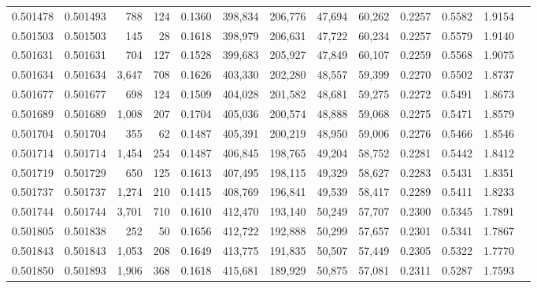 \begin{tabular}{rrrrrrrrrrrrr}
0.501478 & 0.501493 &   788 &   124 &                                     0.1360 & 398,834 & 206,776 &  47,694 &  60,262 & 0.2257 & 0.5582 & 1.9154 \\
0.501503 & 0.501503 &   145 &    28 &                                     0.1618 & 398,979 & 206,631 &  47,722 &  60,234 & 0.2257 & 0.5579 & 1.9140 \\
0.501631 & 0.501631 &   704 &   127 &                                     0.1528 & 399,683 & 205,927 &  47,849 &  60,107 & 0.2259 & 0.5568 & 1.9075 \\
0.501634 & 0.501634 & 3,647 &   708 &                                     0.1626 & 403,330 & 202,280 &  48,557 &  59,399 & 0.2270 & 0.5502 & 1.8737 \\
0.501677 & 0.501677 &   698 &   124 &                                     0.1509 & 404,028 & 201,582 &  48,681 &  59,275 & 0.2272 & 0.5491 & 1.8673 \\
0.501689 & 0.501689 & 1,008 &   207 &                                     0.1704 & 405,036 & 200,574 &  48,888 &  59,068 & 0.2275 & 0.5471 & 1.8579 \\
0.501704 & 0.501704 &   355 &    62 &                                     0.1487 & 405,391 & 200,219 &  48,950 &  59,006 & 0.2276 & 0.5466 & 1.8546 \\
0.501714 & 0.501714 & 1,454 &   254 &                                     0.1487 & 406,845 & 198,765 &  49,204 &  58,752 & 0.2281 & 0.5442 & 1.8412 \\
0.501719 & 0.501729 &   650 &   125 &                                     0.1613 & 407,495 & 198,115 &  49,329 &  58,627 & 0.2283 & 0.5431 & 1.8351 \\
0.501737 & 0.501737 & 1,274 &   210 &                                     0.1415 & 408,769 & 196,841 &  49,539 &  58,417 & 0.2289 & 0.5411 & 1.8233 \\
0.501744 & 0.501744 & 3,701 &   710 &                                     0.1610 & 412,470 & 193,140 &  50,249 &  57,707 & 0.2300 & 0.5345 & 1.7891 \\
0.501805 & 0.501838 &   252 &    50 &                                     0.1656 & 412,722 & 192,888 &  50,299 &  57,657 & 0.2301 & 0.5341 & 1.7867 \\
0.501843 & 0.501843 & 1,053 &   208 &                                     0.1649 & 413,775 & 191,835 &  50,507 &  57,449 & 0.2305 & 0.5322 & 1.7770 \\
0.501850 & 0.501893 & 1,906 &   368 &                                     0.1618 & 415,681 & 189,929 &  50,875 &  57,081 & 0.2311 & 0.5287 & 1.7593 \\

\end{tabular}
